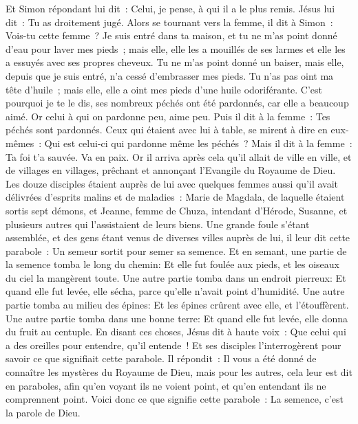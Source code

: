 \begin{multicols}{2}
Et Simon répondant lui dit~: Celui, je pense, à qui il a le plus remis. Jésus lui dit~: Tu as droitement jugé.
Alors se tournant vers la femme, il dit à Simon~: Vois-tu cette femme~? Je suis entré dans ta maison, et tu ne m'as point donné d'eau pour laver mes pieds~; mais elle, elle les a mouillés de ses larmes et elle les a essuyés avec ses propres cheveux.
Tu ne m'as point donné un baiser, mais elle, depuis que je suis entré, n'a cessé d'embrasser mes pieds.
Tu n'as pas oint ma tête d'huile~; mais elle, elle a oint mes pieds d'une huile odoriférante.
C'est pourquoi je te le dis, ses nombreux péchés ont été pardonnés, car elle a beaucoup aimé. Or celui à qui on pardonne peu, aime peu.
Puis il dit à la femme~: Tes péchés sont pardonnés.
Ceux qui étaient avec lui à table, se mirent à dire en eux-mêmes~: Qui est celui-ci qui pardonne même les péchés~?
Mais il dit à la femme~: Ta foi t'a sauvée. Va en paix.
\VerseOne{}Or il arriva après cela qu'il allait de ville en ville, et de villages en villages, prêchant et annonçant l'Evangile du Royaume de Dieu.
Les douze disciples étaient auprès de lui avec quelques femmes aussi qu'il avait délivrées d'esprits malins et de maladies~: Marie de Magdala, de laquelle étaient sortis sept démons,
et Jeanne, femme de Chuza, intendant d'Hérode, Susanne, et plusieurs autres qui l'assistaient de leurs biens.
Une grande foule s'étant assemblée, et des gens étant venus de diverses villes auprès de lui, il leur dit cette parabole~:
Un semeur sortit pour semer sa semence. Et en semant, une partie de la semence tomba le long du chemin: Et elle fut foulée aux pieds, et les oiseaux du ciel la mangèrent toute.
Une autre partie tomba dans un endroit pierreux: Et quand elle fut levée, elle sécha, parce qu'elle n'avait point d'humidité.
Une autre partie tomba au milieu des épines: Et les épines crûrent avec elle, et l'étouffèrent.
Une autre partie tomba dans une bonne terre: Et quand elle fut levée, elle donna du fruit au centuple. En disant ces choses, Jésus dit à haute voix~: Que celui qui a des oreilles pour entendre, qu'il entende~!
Et ses disciples l'interrogèrent pour savoir ce que signifiait cette parabole.
Il répondit~: Il vous a été donné de connaître les mystères du Royaume de Dieu, mais pour les autres, cela leur est dit en paraboles, afin qu'en voyant ils ne voient point, et qu'en entendant ils ne comprennent point.
Voici donc ce que signifie cette parabole~: La semence, c'est la parole de Dieu.

\end{multicols}
